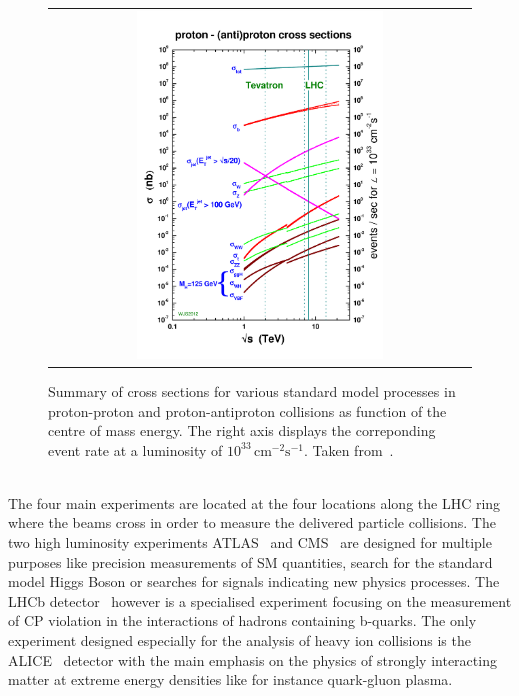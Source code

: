 \begin{figure}[!tp]
  \centering
  \begin{tabular}{c}
    \includegraphics[width=0.60\textwidth]{figures/crosssections2012_v5-1.pdf}
  \end{tabular}
  \caption{Summary of cross sections for various standard model processes in proton-proton and proton-antiproton collisions as function of the centre of mass energy. The right axis displays the correponding event rate at a luminosity of $\mathrm{10^{33}\,cm^{-2} s^{-1}}$. Taken from~\cite{bib:stirling:pcom}.}
  \label{fig:CrossSections}
\end{figure}
\\
The four main experiments are located at the four locations along the LHC ring where the beams cross in order to measure the delivered particle collisions. The two high luminosity experiments ATLAS~\cite{det::ATLAS} and CMS~\cite{Chatrchyan:2008zzk, bib:cmsptdr1} are designed for multiple purposes like precision measurements of SM quantities, search for the standard model Higgs Boson or searches for signals indicating new physics processes. The LHCb detector~\cite{det::LHCb} however is a specialised experiment focusing on the measurement of CP violation in the interactions of hadrons containing b-quarks. The only experiment designed especially for the analysis of heavy ion collisions is the ALICE~\cite{det::ALICE} detector with the main emphasis on the physics of strongly interacting matter at extreme energy densities like for instance quark-gluon plasma.

